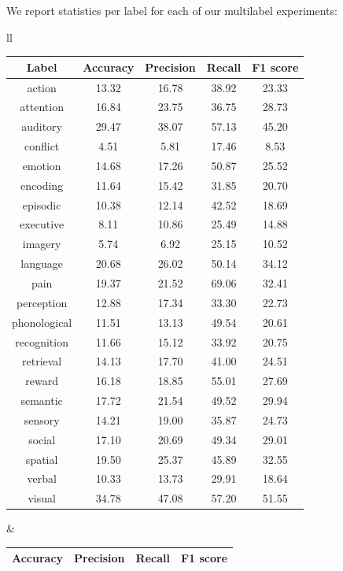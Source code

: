 \documentclass{article} %
\begin{document}
We report statistics per label for each of our multilabel experiments:
\begin{table}[h]
\begin{center}
\begin{tabular}{ll}
\begin{tabular}{|c|c|c|c|c|}
\hline
 \bf{Label}  & \bf{Accuracy} & \bf{Precision} & \bf{Recall}    & \bf{F1 score} \\ \hline
action	& 13.32	& 16.78	& 38.92	& 23.33	\\ \hline 
attention	& 16.84	& 23.75	& 36.75	& 28.73	\\ \hline 
auditory	& 29.47	& 38.07	& 57.13	& 45.20	\\ \hline 
conflict	& 4.51	& 5.81	& 17.46	& 8.53	\\ \hline 
emotion	& 14.68	& 17.26	& 50.87	& 25.52	\\ \hline 
encoding	& 11.64	& 15.42	& 31.85	& 20.70	\\ \hline 
episodic	& 10.38	& 12.14	& 42.52	& 18.69	\\ \hline 
executive	& 8.11	& 10.86	& 25.49	& 14.88	\\ \hline 
imagery	& 5.74	& 6.92	& 25.15	& 10.52	\\ \hline 
language	& 20.68	& 26.02	& 50.14	& 34.12	\\ \hline 
pain	& 19.37	& 21.52	& 69.06	& 32.41	\\ \hline 
perception	& 12.88	& 17.34	& 33.30	& 22.73	\\ \hline 
phonological	& 11.51	& 13.13	& 49.54	& 20.61	\\ \hline 
recognition	& 11.66	& 15.12	& 33.92	& 20.75	\\ \hline 
retrieval	& 14.13	& 17.70	& 41.00	& 24.51	\\ \hline 
reward	& 16.18	& 18.85	& 55.01	& 27.69	\\ \hline 
semantic	& 17.72	& 21.54	& 49.52	& 29.94	\\ \hline 
sensory	& 14.21	& 19.00	& 35.87	& 24.73	\\ \hline 
social	& 17.10	& 20.69	& 49.34	& 29.01	\\ \hline 
spatial	& 19.50	& 25.37	& 45.89	& 32.55	\\ \hline 
verbal	& 10.33	& 13.73	& 29.91	& 18.64	\\ \hline 
visual	& 34.78	& 47.08	& 57.20	& 51.55	\\ \hline 
\end{tabular}
&
\begin{tabular}{|c|c|c|c|}
\hline
 \bf{Accuracy} & \bf{Precision} & \bf{Recall}    & \bf{F1 score} \\ \hline

\end{tabular}
\end{tabular}
\end{center}
\end{table}
\end{document}
